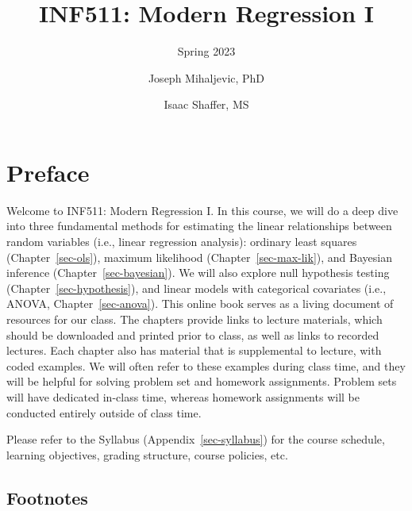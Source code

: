 \documentclass[
  letterpaper,
  DIV=11,
  numbers=noendperiod]{scrreprt}
\title{INF511: Modern Regression I}
\subtitle{Spring 2023}
\author{Joseph Mihaljevic, PhD \and Isaac Shaffer, MS}
\date{}
\renewcommand*\contentsname{Table of contents}
\newcommand\contentsname{Table of contents}
\begin{document}
\maketitle
\ifdefined\Shaded\renewenvironment{Shaded}{\begin{tcolorbox}[enhanced, sharp corners, borderline west={3pt}{0pt}{shadecolor}, interior hidden, frame hidden, boxrule=0pt, breakable]}{\end{tcolorbox}}\fi

\renewcommand*\contentsname{Table of contents}
{
\hypersetup{linkcolor=}
\setcounter{tocdepth}{2}
\tableofcontents
}

\hypertarget{preface}{%
\chapter*{Preface}\label{preface}}


Welcome to INF511: Modern Regression I. In this course, we will do a
deep dive into three fundamental methods for estimating the linear
relationships between random variables (i.e., linear regression
analysis): ordinary least squares (Chapter~\ref{sec-ols}), maximum
likelihood (Chapter~\ref{sec-max-lik}), and Bayesian inference
(Chapter~\ref{sec-bayesian}). We will also explore null hypothesis
testing (Chapter~\ref{sec-hypothesis}), and linear models with
categorical covariates (i.e., ANOVA, Chapter~\ref{sec-anova}). This
online book serves as a living document of resources for our class. The
chapters provide links to lecture materials, which should be downloaded
and printed prior to class, as well as links to recorded lectures. Each
chapter also has material that is supplemental to lecture, with coded
examples. We will often refer to these examples during class time, and
they will be helpful for solving problem set and homework assignments.
Problem sets will have dedicated in-class time, whereas homework
assignments will be conducted entirely outside of class time.

Please refer to the Syllabus (Appendix~\ref{sec-syllabus}) for the
course schedule, learning objectives, grading structure, course
policies, etc.

\hypertarget{footnotes}{%
\section*{Footnotes}\label{footnotes}}
\end{document}
